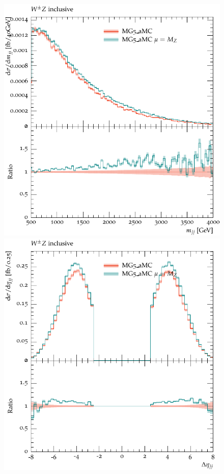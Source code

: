 \documentclass[11pt]{cernrep}
\begin{document}
\begin{figure}[htbp]
\begin{center}
   \includegraphics[scale=0.5]{figs/MG_mjj}
   \includegraphics[scale=0.5]{figs/MG_dEtajj}

\end{center}
\end{figure}
\end{document}

